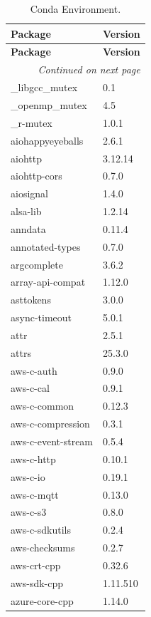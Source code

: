 
\begin{longtable}{ll}
    \caption{Conda Environment.} \label{tab:python_env} \\
    \hline
    \textbf{Package} & \textbf{Version} \\
    \hline
    \endfirsthead

    \hline
    \textbf{Package} & \textbf{Version} \\
    \hline
    \endhead

    \hline
    \multicolumn{2}{r}{\textit{Continued on next page}} \\
    \endfoot

    \hline
    \endlastfoot
    \hline
    \_libgcc\_mutex&0.1 \\
    \_openmp\_mutex&4.5 \\
    \_r-mutex&1.0.1 \\
    aiohappyeyeballs&2.6.1 \\
    aiohttp&3.12.14 \\
    aiohttp-cors&0.7.0 \\
    aiosignal&1.4.0 \\
    alsa-lib&1.2.14 \\
    anndata&0.11.4 \\
    annotated-types&0.7.0 \\
    argcomplete&3.6.2 \\
    array-api-compat&1.12.0 \\
    asttokens&3.0.0 \\
    async-timeout&5.0.1 \\
    attr&2.5.1 \\
    attrs&25.3.0 \\
    aws-c-auth&0.9.0 \\
    aws-c-cal&0.9.1 \\
    aws-c-common&0.12.3 \\
    aws-c-compression&0.3.1 \\
    aws-c-event-stream&0.5.4 \\
    aws-c-http&0.10.1 \\
    aws-c-io&0.19.1 \\
    aws-c-mqtt&0.13.0 \\
    aws-c-s3&0.8.0 \\
    aws-c-sdkutils&0.2.4 \\
    aws-checksums&0.2.7 \\
    aws-crt-cpp&0.32.6 \\
    aws-sdk-cpp&1.11.510 \\
    azure-core-cpp&1.14.0 \\

\end{longtable}
